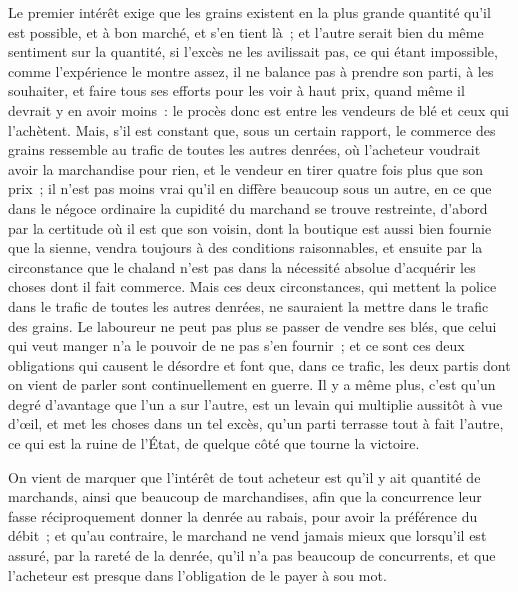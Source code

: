 \documentclass[french,twoside]{book} %
\begin{document}
Le premier intérêt exige que les grains existent en la plus grande quantité qu’il est possible, et à bon marché, et s’en tient là ; et l’autre serait bien du même sentiment sur la quantité, si l’excès ne les avilissait pas, ce qui étant impossible, comme l’expérience le montre assez, il ne balance pas à prendre son parti, à les souhaiter, et faire tous ses efforts pour les voir à haut prix, quand même il devrait y en avoir moins : le procès donc est entre les vendeurs de blé et ceux qui l’achètent. Mais, s’il est constant que, sous un certain rapport, le commerce des grains ressemble au trafic de toutes les autres denrées, où l’acheteur voudrait avoir la marchandise pour rien, et le vendeur en tirer quatre fois plus que son prix ; il n’est pas moins vrai qu’il en diffère beaucoup sous un autre, en ce que dans le négoce ordinaire la cupidité du marchand se trouve restreinte, d’abord par la certitude où il est que son voisin, dont la boutique est aussi bien fournie que la sienne, vendra toujours à des conditions raisonnables, et ensuite par la circonstance que le chaland n’est pas dans la nécessité absolue d’acquérir les choses dont il fait commerce. Mais ces deux circonstances, qui mettent la police dans le trafic de toutes les autres denrées, ne sauraient la mettre dans le trafic des grains. Le laboureur ne peut pas plus se passer de vendre ses blés, que celui qui veut manger n’a le pouvoir de ne pas s’en fournir ; et ce sont ces deux obligations qui causent le désordre et font que, dans ce trafic, les deux partis dont on vient de parler sont continuellement en guerre. Il y a même plus, c’est qu’un degré d’avantage que l’un a sur l’autre, est un levain qui multiplie aussitôt à vue d’œil, et met les choses dans un tel excès, qu’un parti terrasse tout à fait l’autre, ce qui est la ruine de l’État, de quelque côté que tourne la victoire.\par
On vient de marquer que l’intérêt de tout acheteur est qu’il y ait quantité de marchands, ainsi que beaucoup de marchandises, afin que la concurrence leur fasse réciproquement donner la denrée au rabais, pour avoir la préférence du débit ; et qu’au contraire, le marchand ne vend jamais mieux que lorsqu’il est assuré, par la rareté de la denrée, qu’il n’a pas beaucoup de concurrents, et que l’acheteur est presque dans l’obligation de le payer à sou mot.\par
\end{document}
